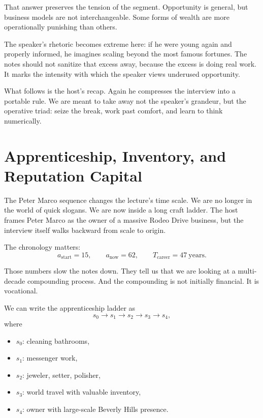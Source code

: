 That answer preserves the tension of the segment. Opportunity is general, but business models are not interchangeable. Some forms of wealth are more operationally punishing than others.

The speaker's rhetoric becomes extreme here: if he were young again and properly informed, he imagines scaling beyond the most famous fortunes. The notes should not sanitize that excess away, because the excess is doing real work. It marks the intensity with which the speaker views underused opportunity.

What follows is the host's recap. Again he compresses the interview into a portable rule. We are meant to take away not the speaker's grandeur, but the operative triad: seize the break, work past comfort, and learn to think numerically.

\section{Apprenticeship, Inventory, and Reputation Capital}

The Peter Marco sequence changes the lecture's time scale. We are no longer in the world of quick slogans. We are now inside a long craft ladder. The host frames Peter Marco as the owner of a massive Rodeo Drive business, but the interview itself walks backward from scale to origin.

The chronology matters:
\begin{equation}
a_{\mathrm{start}} = 15,\qquad a_{\mathrm{now}} = 62,\qquad T_{\mathrm{career}} = 47\ \mathrm{years}.
\end{equation}

Those numbers slow the notes down. They tell us that we are looking at a multi-decade compounding process. And the compounding is not initially financial. It is vocational.

We can write the apprenticeship ladder as
\begin{equation}
s_0 \rightarrow s_1 \rightarrow s_2 \rightarrow s_3 \rightarrow s_4,
\end{equation}
where
\begin{itemize}
\item \(s_0\): cleaning bathrooms,
\item \(s_1\): messenger work,
\item \(s_2\): jeweler, setter, polisher,
\item \(s_3\): world travel with valuable inventory,
\item \(s_4\): owner with large-scale Beverly Hills presence.
\end{itemize}

